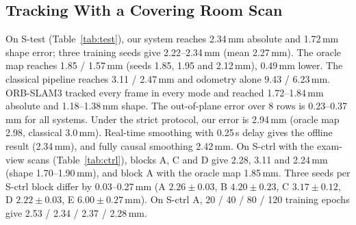 \documentclass[9pt,shortpaper,twoside,web]{ieeecolor2}
\newcommand{\Stest}{S-test}
\newcommand{\Sctrl}{S-ctrl}
\begin{document}
\subsection{Tracking With a Covering Room Scan}
\label{sec:res_main}
On \Stest{} (Table~\ref{tab:test}), our system reaches 2.34\,mm absolute and 1.72\,mm shape error; three training seeds give 2.22--2.34\,mm (mean 2.27\,mm). The oracle map reaches 1.85 / 1.57\,mm (seeds 1.85, 1.95 and 2.12\,mm), 0.49\,mm lower. The classical pipeline reaches 3.11 / 2.47\,mm and odometry alone 9.43 / 6.23\,mm. ORB-SLAM3 tracked every frame in every mode and reached 1.72--1.84\,mm absolute and 1.18--1.38\,mm shape. The out-of-plane error over 8 rows is 0.23--0.37\,mm for all systems. Under the strict protocol, our error is 2.94\,mm (oracle map 2.98, classical 3.0\,mm). Real-time smoothing with 0.25\,s delay gives the offline result (2.34\,mm), and fully causal smoothing 2.42\,mm. On \Sctrl{} with the exam-view scans (Table~\ref{tab:ctrl}), blocks A, C and D give 2.28, 3.11 and 2.24\,mm (shape 1.70--1.90\,mm), and block A with the oracle map 1.85\,mm. Three seeds per \Sctrl{} block differ by 0.03--0.27\,mm (A $2.26\pm0.03$, B $4.20\pm0.23$, C $3.17\pm0.12$, D $2.22\pm0.03$, E $6.00\pm0.27$\,mm). On \Sctrl{} A, 20 / 40 / 80 / 120 training epochs give 2.53 / 2.34 / 2.37 / 2.28\,mm.
\end{document}
